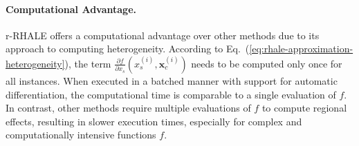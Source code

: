 \documentclass[
twocolumn,
]{ceurart}
\newcommand{\xci}{\mathbf{x}^{(i)}_c}
\begin{document}
\paragraph{Computational Advantage.}

r-RHALE offers a computational advantage over other methods due to its approach to computing heterogeneity. According to Eq.~(\ref{eq:rhale-approximation-heterogeneity}), the term \( \frac{\partial f}{\partial x_s} (x_s^{(i)}, \xci) \) needs to be computed only once for all instances. When executed in a batched manner with support for automatic differentiation, the computational time is comparable to a single evaluation of \( f \). In contrast, other methods require multiple evaluations of \( f \) to compute regional effects, resulting in slower execution times, especially for complex and computationally intensive functions \( f \).
\end{document}
